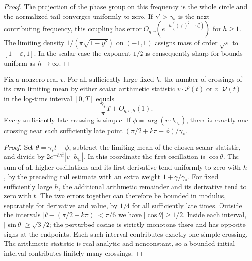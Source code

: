 \begin{proof}
The projection of the phase group on this frequency is the
whole circle and the normalized tail converges uniformly to zero.
If $\gamma'>\gamma_*$ is the next contributing frequency, this coupling
has error $O_{q,v}(e^{-h((\gamma')^2-\gamma_*^2)})$ for $h\ge1$.
The limiting density $1/(\pi\sqrt{1-y^2})$ on $(-1,1)$ assigns mass
of order $\sqrt\varepsilon$ to $[1-\varepsilon,1]$. In the scalar
case the exponent $1/2$ is consequently sharp for bounds uniform
as $h\to\infty$.
\end{proof}

\begin{corollary}
\label{cor:crossings}
Fix a nonzero real $v$. For all sufficiently large fixed $h$, the
number of crossings of its own limiting mean by either scalar arithmetic
statistic $v\cdot \mathcal P(t)$ or $v\cdot \mathcal Q(t)$ in the
log-time interval $[0,T]$ equals
\[
                    \frac{\gamma_*}{\pi}T+O_{q,v,h}(1).
\]
Every sufficiently late crossing is simple. If
$\phi=\arg(v\cdot b_{\gamma_*})$, there is exactly one crossing near
each sufficiently late point $(\pi/2+k\pi-\phi)/\gamma_*$.
\end{corollary}

\begin{proof}
Set $\theta=\gamma_*t+\phi$, subtract the limiting mean of the
chosen scalar statistic, and divide by
$2e^{-h\gamma_*^2}|v\cdot b_{\gamma_*}|$.
In this coordinate the first oscillation is $\cos\theta$. The sum of
all higher oscillations and its first derivative tend uniformly to
zero with $h$, by the preceding tail estimate with an extra weight
$1+\gamma/\gamma_*$. For fixed sufficiently large $h$, the additional
arithmetic remainder and its derivative tend to zero with $t$. The two
errors together can therefore be bounded in modulus, separately for
derivative and value, by $1/4$ for all sufficiently late times.
Outside the intervals $|\theta-(\pi/2+k\pi)|<\pi/6$ we have
$|\cos\theta|\ge1/2$. Inside each interval, $|\sin\theta|\ge\sqrt3/2$;
the perturbed cosine is strictly monotone there and has opposite signs
at the endpoints. Each such interval contributes exactly one simple
crossing. The arithmetic statistic is real analytic and nonconstant,
so a bounded initial interval contributes finitely many crossings.
\end{proof}


